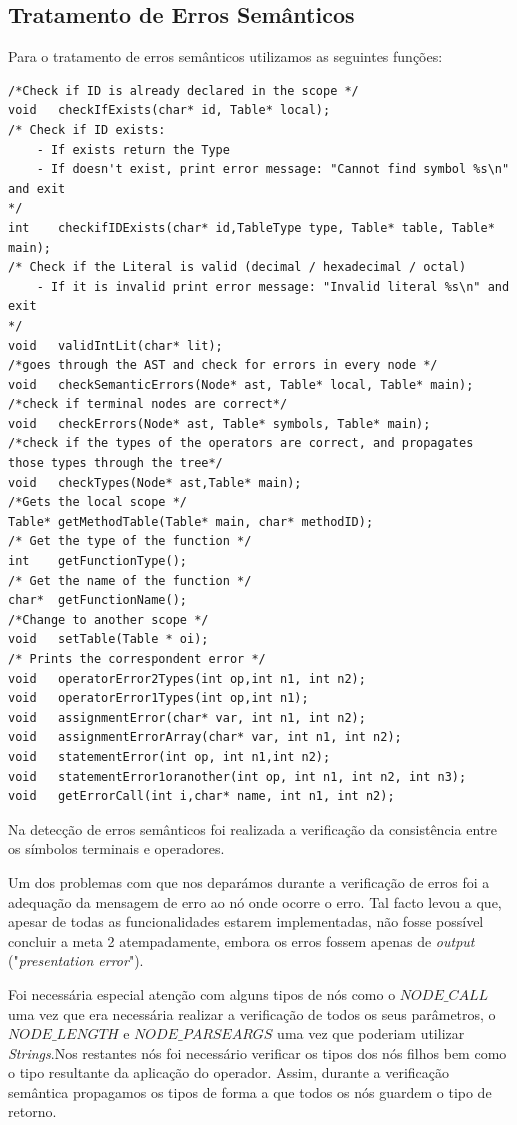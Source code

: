 \documentclass[12pt]{article}
\begin{document}
\pagebreak
\subsection{Tratamento de Erros Semânticos}
Para o tratamento de erros semânticos utilizamos as seguintes funções:
\begin{lstlisting}
/*Check if ID is already declared in the scope */
void   checkIfExists(char* id, Table* local);
/* Check if ID exists:
	- If exists return the Type 
	- If doesn't exist, print error message: "Cannot find symbol %s\n" and exit 
*/
int    checkifIDExists(char* id,TableType type, Table* table, Table* main);
/* Check if the Literal is valid (decimal / hexadecimal / octal)
	- If it is invalid print error message: "Invalid literal %s\n" and exit
*/
void   validIntLit(char* lit);
/*goes through the AST and check for errors in every node */
void   checkSemanticErrors(Node* ast, Table* local, Table* main);
/*check if terminal nodes are correct*/
void   checkErrors(Node* ast, Table* symbols, Table* main);
/*check if the types of the operators are correct, and propagates those types through the tree*/
void   checkTypes(Node* ast,Table* main);
/*Gets the local scope */
Table* getMethodTable(Table* main, char* methodID);
/* Get the type of the function */
int    getFunctionType();
/* Get the name of the function */
char*  getFunctionName();
/*Change to another scope */
void   setTable(Table * oi);
/* Prints the correspondent error */
void   operatorError2Types(int op,int n1, int n2);
void   operatorError1Types(int op,int n1);
void   assignmentError(char* var, int n1, int n2);
void   assignmentErrorArray(char* var, int n1, int n2);
void   statementError(int op, int n1,int n2);
void   statementError1oranother(int op, int n1, int n2, int n3);
void   getErrorCall(int i,char* name, int n1, int n2);

\end{lstlisting}

Na detecção de erros semânticos foi realizada a verificação da consistência entre os símbolos terminais e operadores.
\par Um dos problemas com que nos deparámos durante a verificação de erros foi a adequação da mensagem de erro ao nó onde ocorre o erro. Tal facto levou a que, apesar de todas as funcionalidades estarem implementadas, não fosse possível concluir a meta 2 atempadamente, embora os erros fossem apenas de \emph{output} ("\emph{presentation error}"). 
\par Foi necessária especial atenção com alguns tipos de nós como o $NODE\_CALL$ uma vez que era necessária realizar a verificação de todos os seus parâmetros, o $NODE\_LENGTH$ e $NODE\_PARSEARGS$ uma vez que poderiam utilizar \emph{Strings}.Nos restantes nós foi necessário verificar os tipos dos nós filhos bem como o tipo resultante da aplicação do operador. Assim, durante a verificação semântica propagamos os tipos de forma a que todos os nós guardem o tipo de retorno.
\end{document}

